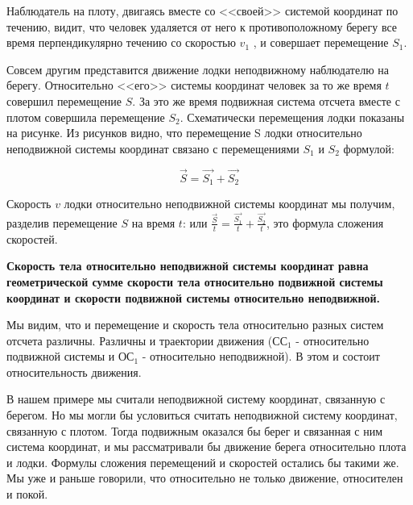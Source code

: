 \documentclass[a6paper, 11pt]{diss_4}
\renewcommand{\'}{\,'}
\begin{document}
  Наблюдатель на плоту, двигаясь вместе со <<своей>> системой координат по
течению, видит, что человек удаляется от него к противоположному берегу все
время перпендикулярно течению со скоростью $v_1$ , и совершает перемещение
$S_1$.

  Совсем другим представится движение лодки неподвижному наблюдателю на
берегу. Относительно <<его>> системы координат человек за то же время $t$
совершил перемещение $S$. За это же время подвижная система отсчета вместе с
плотом совершила перемещение $S_2$. Схематически перемещения лодки показаны
на рисунке. Из рисунков видно, что перемещение S лодки относительно
неподвижной системы координат связано с перемещениями $S_1$ и $S_2$ формулой:

\[\vec{S}=\vec{S_1}+\vec{S_2}\]

  Скорость $v$ лодки относительно неподвижной системы координат мы получим,
разделив перемещение $S$ на время $t$: или
$\frac{\vec{S}}{t}=\frac{\vec{S_1}}{t}+\frac{\vec{S_2}}{t}$, это формула
сложения скоростей.

\textbf{  Скорость тела относительно неподвижной системы координат равна
геометрической сумме скорости тела относительно подвижной системы координат и
скорости подвижной системы относительно неподвижной.}

  Мы видим, что и перемещение и скорость тела относительно разных систем
отсчета различны. Различны и траектории движения ($СС_1$ - относительно
подвижной системы и $ОС_1$ - относительно неподвижной). В этом и состоит
относительность движения.

  В нашем примере мы считали неподвижной систему координат, связанную с
берегом. Но мы могли бы условиться считать неподвижной систему координат,
связанную с плотом. Тогда подвижным оказался бы берег и связанная с ним система
координат, и мы рассматривали бы движение берега относительно плота и лодки.
Формулы сложения перемещений и скоростей остались бы такими же. Мы уже и раньше
говорили, что относительно не только движение, относителен и покой.
\end{document}
